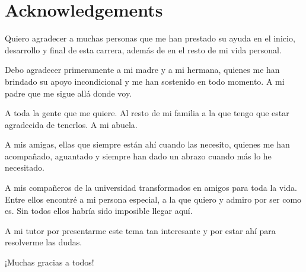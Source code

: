 \thispagestyle{empty}

\chapter*{Acknowledgements}
\label{cha:acknowledgements}

Quiero agradecer a muchas personas que me han prestado su ayuda en el inicio, desarrollo y final de esta carrera, además de en el resto de mi vida personal.

Debo agradecer primeramente a mi madre y a mi hermana, quienes me han brindado su apoyo incondicional y me han sostenido en todo momento. A mi padre que me sigue allá donde voy.

A toda la gente que me quiere. Al resto de mi familia a la que tengo que estar agradecida de tenerlos. A mi abuela.

A mis amigas, ellas que siempre están ahí cuando las necesito, quienes me han acompañado, aguantado y siempre han dado un abrazo cuando más lo he necesitado.

A mis compañeros de la universidad transformados en amigos para toda la vida. Entre ellos encontré a mi persona especial, a la que quiero y admiro por ser como es. Sin todos ellos habría sido imposible llegar aquí.

A mi tutor por presentarme este tema tan interesante y por estar ahí para resolverme las dudas.

¡Muchas gracias a todos!